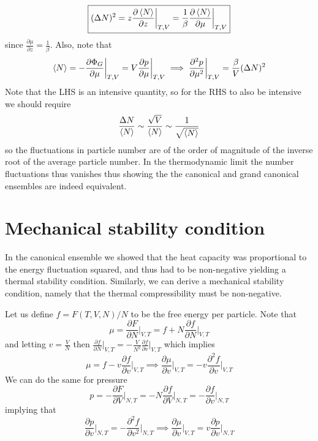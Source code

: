 \documentclass[a4paper,11pt,oneside]{book}
\begin{document}
\begin{equation}
    \boxed{(\Delta N)^2 = z\frac{\partial \braket{N}}{\partial z}\bigg|_{T,V}=\frac{1}{\beta} \frac{\partial \braket{N}}{\partial \mu}\bigg|_{T,V}}
\end{equation}
since $\frac{\partial \mu}{\partial z} = \frac{1}{\beta}$. Also, note that
\begin{equation}
    \braket{N} = -\frac{\partial \Phi_G}{\partial \mu} \bigg|_{T,V} = V \frac{\partial p}{\partial \mu}\bigg|_{T,V}
\implies
    \frac{\partial ^2 p}{\partial \mu^2}\bigg|_{T,V} = \frac{\beta}{V} (\Delta N)^2
\end{equation}
Note that the LHS is an intensive quantity, so for the RHS to also be intensive we should require
\begin{equation}
    \frac{\Delta N}{\braket{N}} \sim \frac{\sqrt{V}}{\braket{N}} \sim \frac{1}{\sqrt{\braket{N}}}
\end{equation}
so the fluctuations in particle number are of the order of magnitude of the inverse root of the average particle number. In the thermodynamic limit the number fluctuations thus vanishes thus showing the the canonical and grand canonical ensembles are indeed equivalent.
\section{Mechanical stability condition}
In the canonical ensemble we showed that the heat capacity was proportional to the energy fluctuation squared, and thus had to be non-negative yielding a thermal stability condition. Similarly, we can derive a mechanical stability condition, namely that the thermal compressibility must be non-negative.

Let us define $f=F(T,V,N)/N$ to be the free energy per particle. Note that
\begin{equation}
    \mu = \frac{\partial F}{\partial N}\bigg|_{V,T} =  f + N \frac{\partial f}{\partial N}\bigg|_{V,T}
\end{equation}
and letting $v=\frac{V}{N}$ then $\frac{\partial f}{\partial N}\big|_{V,T} = -\frac{V}{N^2}\frac{\partial f}{\partial v}\big|_{V,T}$ which implies
\begin{equation}
   \mu = f - v\frac{\partial f}{\partial v} \bigg|_{V,T}\implies \frac{\partial \mu}{\partial v}\bigg|_{V,T} =-v \frac{\partial^2 f}{\partial v}\bigg|_{V,T}
\end{equation}
We can do the same for pressure
\begin{equation}
    p = -\frac{\partial F}{\partial V}\bigg|_{N,T} =-N\frac{\partial f}{\partial V}\bigg|_{N,T} = -\frac{\partial f}{\partial v}\bigg|_{N,T}
\end{equation}
implying that
\begin{equation}
    \frac{\partial p}{\partial v}\bigg|_{N,T} = -\frac{\partial^2 f}{\partial v^2}\bigg|_{N,T} \implies \frac{\partial \mu}{\partial v}\bigg|_{V,T} = v \frac{\partial p}{\partial v}\bigg|_{N,T} 
\end{equation}
\end{document}
